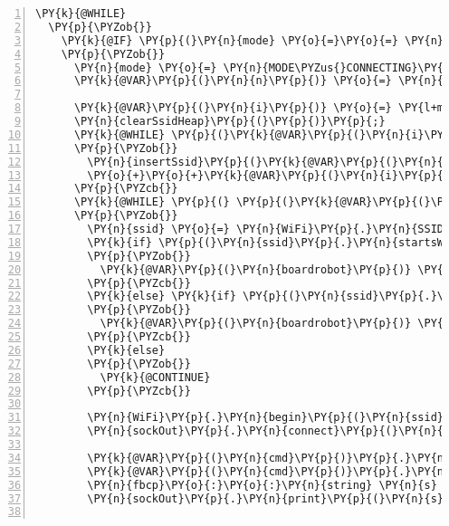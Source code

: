 \begin{Verbatim}[commandchars=\\\{\},numbers=left,firstnumber=1,stepnumber=1,frame=leftline,numbersep=0pt]
  \PY{k}{@WHILE}
  \PY{p}{\PYZob{}}
    \PY{k}{@IF} \PY{p}{(}\PY{n}{mode} \PY{o}{=}\PY{o}{=} \PY{n}{MODE\PYZus{}IDLE}\PY{p}{)}
    \PY{p}{\PYZob{}} 
      \PY{n}{mode} \PY{o}{=} \PY{n}{MODE\PYZus{}CONNECTING}\PY{p}{;}
      \PY{k}{@VAR}\PY{p}{(}\PY{n}{n}\PY{p}{)} \PY{o}{=} \PY{n}{WiFi}\PY{p}{.}\PY{n}{scanNetworks}\PY{p}{(}\PY{p}{)}\PY{p}{;}

      \PY{k}{@VAR}\PY{p}{(}\PY{n}{i}\PY{p}{)} \PY{o}{=} \PY{l+m+mi}{0}\PY{p}{;}
      \PY{n}{clearSsidHeap}\PY{p}{(}\PY{p}{)}\PY{p}{;}
      \PY{k}{@WHILE} \PY{p}{(}\PY{k}{@VAR}\PY{p}{(}\PY{n}{i}\PY{p}{)} \PY{o}{\PYZlt{}} \PY{k}{@VAR}\PY{p}{(}\PY{n}{n}\PY{p}{)}\PY{p}{)}
      \PY{p}{\PYZob{}}
        \PY{n}{insertSsid}\PY{p}{(}\PY{k}{@VAR}\PY{p}{(}\PY{n}{i}\PY{p}{)}\PY{p}{)}\PY{p}{;}
        \PY{o}{+}\PY{o}{+}\PY{k}{@VAR}\PY{p}{(}\PY{n}{i}\PY{p}{)}\PY{p}{;}
      \PY{p}{\PYZcb{}}
      \PY{k}{@WHILE} \PY{p}{(} \PY{p}{(}\PY{k}{@VAR}\PY{p}{(}\PY{n}{i}\PY{p}{)}\PY{o}{=}\PY{n}{popSsid}\PY{p}{(}\PY{p}{)}\PY{p}{)} \PY{o}{\PYZlt{}} \PY{k}{@VAR}\PY{p}{(}\PY{n}{n}\PY{p}{)}\PY{p}{)}
      \PY{p}{\PYZob{}}
        \PY{n}{ssid} \PY{o}{=} \PY{n}{WiFi}\PY{p}{.}\PY{n}{SSID}\PY{p}{(}\PY{k}{@VAR}\PY{p}{(}\PY{n}{i}\PY{p}{)}\PY{p}{)}\PY{p}{.}\PY{n}{c\PYZus{}str}\PY{p}{(}\PY{p}{)}\PY{p}{;}
        \PY{k}{if} \PY{p}{(}\PY{n}{ssid}\PY{p}{.}\PY{n}{startsWith}\PY{p}{(}\PY{n}{fbcp}\PY{o}{:}\PY{o}{:}\PY{n}{BOARD\PYZus{}PREFIX}\PY{p}{)}\PY{p}{)}
        \PY{p}{\PYZob{}}
          \PY{k}{@VAR}\PY{p}{(}\PY{n}{boardrobot}\PY{p}{)} \PY{o}{=} \PY{n+nb}{true}\PY{p}{;}
        \PY{p}{\PYZcb{}}
        \PY{k}{else} \PY{k}{if} \PY{p}{(}\PY{n}{ssid}\PY{p}{.}\PY{n}{startsWith}\PY{p}{(}\PY{n}{fbcp}\PY{o}{:}\PY{o}{:}\PY{n}{ROBOT\PYZus{}PREFIX}\PY{p}{)}\PY{p}{)}
        \PY{p}{\PYZob{}}
          \PY{k}{@VAR}\PY{p}{(}\PY{n}{boardrobot}\PY{p}{)} \PY{o}{=} \PY{n+nb}{false}\PY{p}{;}
        \PY{p}{\PYZcb{}}
        \PY{k}{else}
        \PY{p}{\PYZob{}}
          \PY{k}{@CONTINUE}
        \PY{p}{\PYZcb{}}
        
        \PY{n}{WiFi}\PY{p}{.}\PY{n}{begin}\PY{p}{(}\PY{n}{ssid}\PY{p}{.}\PY{n}{c\PYZus{}str}\PY{p}{(}\PY{p}{)}\PY{p}{)}\PY{p}{;}
        \PY{n}{sockOut}\PY{p}{.}\PY{n}{connect}\PY{p}{(}\PY{n}{IPAddress}\PY{p}{(}\PY{l+m+mi}{192}\PY{p}{,}\PY{l+m+mi}{168}\PY{p}{,}\PY{l+m+mi}{1}\PY{p}{,}\PY{l+m+mi}{1}\PY{p}{)}\PY{p}{,} \PY{n}{FBNet}\PY{o}{:}\PY{o}{:}\PY{n}{PORT}\PY{p}{)}\PY{p}{;}
        
        \PY{k}{@VAR}\PY{p}{(}\PY{n}{cmd}\PY{p}{)}\PY{p}{.}\PY{n}{command} \PY{o}{=} \PY{o}{\PYZam{}}\PY{n}{fbcp}\PY{o}{:}\PY{o}{:}\PY{n}{Q\PYZus{}SINGLE\PYZus{}PRESENTATION}\PY{p}{;}
        \PY{k}{@VAR}\PY{p}{(}\PY{n}{cmd}\PY{p}{)}\PY{p}{.}\PY{n}{params}\PY{p}{[}\PY{l+s}{\PYZdq{}}\PY{l+s}{serial}\PY{l+s}{\PYZdq{}}\PY{p}{]} \PY{o}{=} \PY{n}{fbcp}\PY{o}{:}\PY{o}{:}\PY{n}{serial}\PY{p}{;}
        \PY{n}{fbcp}\PY{o}{:}\PY{o}{:}\PY{n}{string} \PY{n}{s} \PY{o}{=} \PY{n}{fbcp}\PY{o}{:}\PY{o}{:}\PY{n}{writeCommand}\PY{p}{(}\PY{k}{@VAR}\PY{p}{(}\PY{n}{cmd}\PY{p}{)}\PY{p}{)}\PY{p}{;}
        \PY{n}{sockOut}\PY{p}{.}\PY{n}{print}\PY{p}{(}\PY{n}{s}\PY{p}{.}\PY{n}{c\PYZus{}str}\PY{p}{(}\PY{p}{)}\PY{p}{)}\PY{p}{;}
        

\end{Verbatim}
